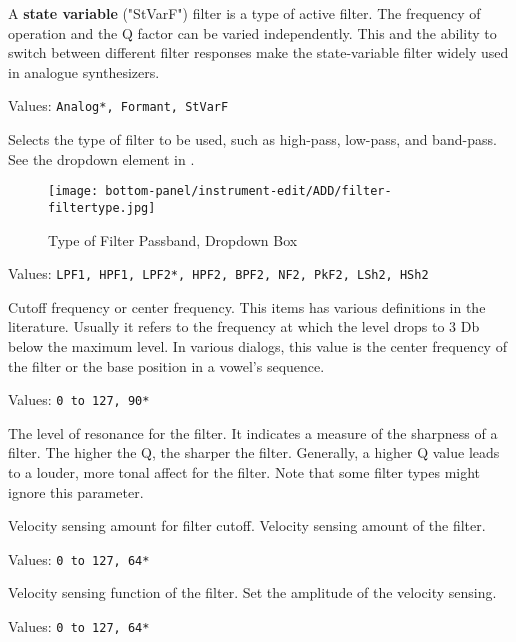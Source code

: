    A \textbf{state variable} ("StVarF") filter
   is a type of active filter.
   The frequency of operation and the Q factor can be varied independently.
   This and the ability to switch between different filter responses make the
   state-variable filter widely used in analogue synthesizers.

   Values: \texttt{Analog*, Formant, StVarF}

   Selects the type of filter to be used, such as high-pass, low-pass,
   and band-pass.
   See the dropdown element in .

\begin{figure}[H]
   \centering 
   \texttt{[image: bottom-panel/instrument-edit/ADD/filter-filtertype.jpg]}
   \caption[Filter Type Dropdown]{Type of Filter Passband, Dropdown Box}
   \label{fig:filter_type_dropdown} 
\end{figure}

   Values: \texttt{LPF1, HPF1, LPF2*, HPF2, BPF2, NF2, PkF2, LSh2, HSh2}

   Cutoff frequency or center frequency.
   This items has various definitions in the literature. 
   Usually it refers to the frequency at which the level
   drops to 3 Db below the maximum level.
   In various dialogs, this value is the
   center frequency of the filter or the base position in
   a vowel's sequence.

   Values: \texttt{0 to 127, 90*}

   The level of resonance for the filter. 
   It indicates a measure of the sharpness of a filter.
   The higher the Q, the sharper the filter.
   Generally, a higher Q value leads to a louder, more tonal
   affect for the filter.
   Note that some filter types might ignore this parameter.

   Velocity sensing amount for filter cutoff.
   Velocity sensing amount of the filter.

   Values: \texttt{0 to 127, 64*}

   Velocity sensing function of the filter.
   Set the amplitude of the velocity sensing.

   Values: \texttt{0 to 127, 64*}

